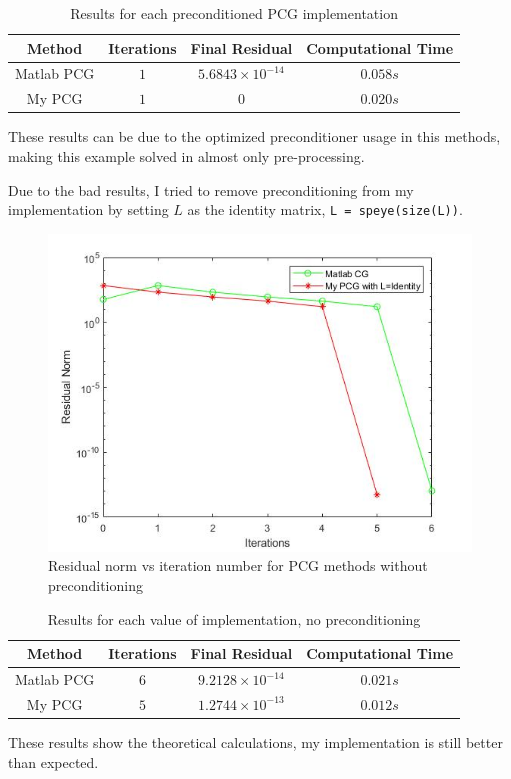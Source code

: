 \documentclass[a4paper, 11pt]{article}
\begin{document}
			\begin{table}[H]
				\centering
				\begin{tabular}{c|c|c|c}
					\textbf{Method} &  \textbf{Iterations} 	& \textbf{Final Residual} 	& \textbf{Computational Time} 	\\ \hline
					Matlab PCG	& 			$1$ 		& $ 5.6843 \times 10^{-14} $ 	& $ 0.058 s $	\\ \hline
					My PCG		& 			$1$ 		& $ 0 $							& $ 0.020 s $	\\ 
				\end{tabular}
				\caption{Results for each preconditioned PCG implementation}
				\label{table:ex3}
			\end{table}
		
			These results can be due to the optimized preconditioner usage in this methods, making this example solved in almost only pre-processing.
			
			Due to the bad results, I tried to remove preconditioning from my implementation by setting $L$ as the identity matrix, \texttt{L = speye(size(L))}.
			\begin{figure}[H]
					\centering
					\includegraphics[width=.6\linewidth]{ex3_NoPrec.jpg}
					\caption{Residual norm vs iteration number for PCG methods without preconditioning}
					\label{fig:ex3_NoPrec}
			\end{figure}
		
			\begin{table}[H]
				\centering
				\begin{tabular}{c|c|c|c}
					\textbf{Method} &  \textbf{Iterations} 	& \textbf{Final Residual} 		& \textbf{Computational Time} 	\\ \hline
					Matlab PCG		& 			$6$ 		& $ 9.2128 \times 10^{-14} $ 	& $ 0.021 s $	\\ \hline	
					My PCG 			& 			$5$			& $ 1.2744 \times 10^{-13} $	& $	0.012 s $	\\ \hline
				\end{tabular}
				\caption{Results for each value of implementation, no preconditioning}
				\label{table:ex3_NoPrec}
			\end{table}
			These results show the theoretical calculations, my implementation is still better than expected.		
			
\end{document}
